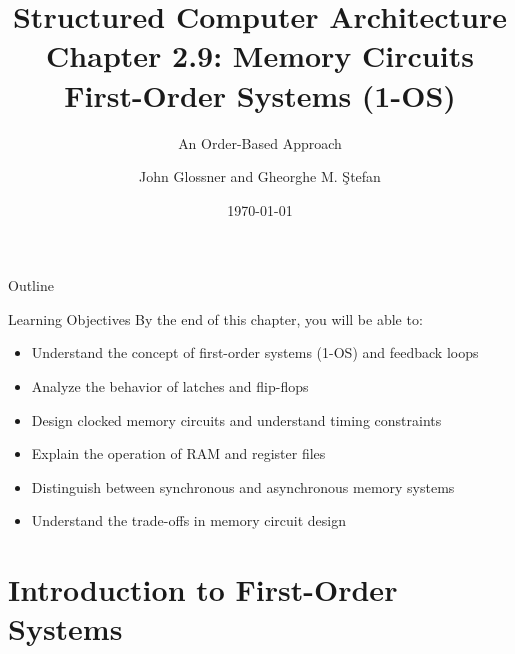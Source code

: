\documentclass[aspectratio=169,11pt]{beamer}
\title[Chapter 2.9: Memory Circuits]{Structured Computer Architecture\\Chapter 2.9: Memory Circuits\\First-Order Systems (1-OS)}
\subtitle{An Order-Based Approach}
\author{John Glossner and Gheorghe M. Ştefan}
\institute{Based on the textbook}
\date{\today}
\begin{document}
\begin{frame}
\titlepage
\end{frame}

\begin{frame}{Outline}
\tableofcontents
\end{frame}

\begin{frame}{Learning Objectives}
By the end of this chapter, you will be able to:
\begin{itemize}
\item Understand the concept of first-order systems (1-OS) and feedback loops
\item Analyze the behavior of latches and flip-flops
\item Design clocked memory circuits and understand timing constraints
\item Explain the operation of RAM and register files
\item Distinguish between synchronous and asynchronous memory systems
\item Understand the trade-offs in memory circuit design
\end{itemize}
\end{frame}

\section{Introduction to First-Order Systems}
\end{document}

